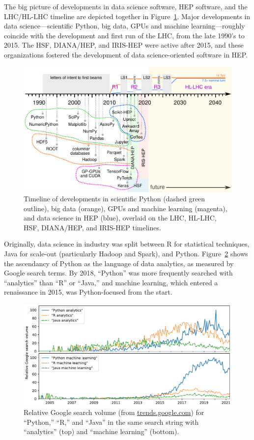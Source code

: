 \documentclass[12pt,a4paper]{article}
\begin{document}
The big picture of developments in data science software, HEP software, and the LHC/HL-LHC timeline are depicted together in Figure~\ref{fig:hllhc-python-timeline-paper}. Major developments in data science---scientific Python, big data, GPUs and machine learning---roughly coincide with the development and first run of the LHC, from the late 1990's to 2015. The HSF, DIANA/HEP, and IRIS-HEP were active after 2015, and these organizations fostered the development of data science-oriented software in HEP.

\begin{figure}
\centering
\includegraphics[width=0.95\linewidth]{fig/hllhc-python-timeline-paper.pdf}

\caption{Timeline of developments in scientific Python (dashed green outline), big data (orange), GPUs and machine learning (magenta), and data science in HEP (blue), overlaid on the LHC, HL-LHC, HSF, DIANA/HEP, and IRIS-HEP timelines. \label{fig:hllhc-python-timeline-paper}}
\end{figure}

Originally, data science in industry was split between R for statistical techniques, Java for scale-out (particularly Hadoop and Spark), and Python. Figure~\ref{fig:analytics-by-language} shows the ascendancy of Python as the language of data analytics, as measured by Google search terms. By 2018, ``Python'' was more frequently searched with ``analytics'' than ``R'' or ``Java,'' and machine learning, which entered a renaissance in 2015, was Python-focused from the start.

\begin{figure}
\centering
\includegraphics[width=0.8\linewidth]{fig/analytics-by-language.pdf}

\caption{Relative Google search volume (from \href{https://trends.google.com/}{trends.google.com}) for ``Python,'' ``R,'' and ``Java'' in the same search string with ``analytics'' (top) and ``machine learning'' (bottom). \label{fig:analytics-by-language}}
\end{figure}
\end{document}
